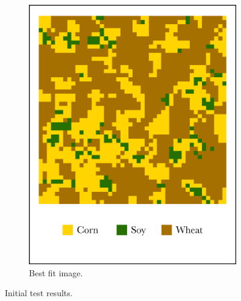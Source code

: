 \begin{figure}
\begin{subfigure}[b]{.45\textwidth}
    \includegraphics[width=\textwidth]{Graphics/bestfit_edited.png}
    \caption{Best fit image.}
    \label{subfig:bestfit1}
  \end{subfigure}
  \caption{Initial test results.}
  \label{fig:testing1}
\end{figure}


